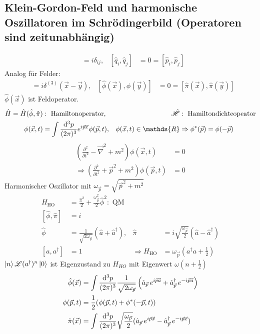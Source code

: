 \subsection{Klein-Gordon-Feld und harmonische Oszillatoren im Schrödingerbild (Operatoren sind zeitunabhängig)}
	\begin{align*}
		[\hat{q}_i, \hat{p}_j] &= i \delta_{ij},&
		[\hat{q}_i, \hat{q}_j] &= 0 = [\hat{p}_i, \hat{p}_j]
	\end{align*}
Analog für Felder:
	\begin{align*}
		[\hat{\phi}(\vec{x}), \hat{\pi}(\vec{y})] &= 
		i \delta^{(3)}(\vec{x}- \vec{y}),&
		[\hat{\phi}(\vec{x}), \hat{\phi}(\vec{y})] &= 0 = 
		[\hat{\pi}(\vec{x}), \hat{\pi}(\vec{y})]
	\end{align*}
$\hat{\phi}(\vec{x})$ ist Feldoperator.
	\begin{align*}
		\hat{H} = \hat{H} (\hat{\phi}, \hat{\pi})&: 
		\text{ Hamiltonoperator},&
		\hat{\Ha}&: \text{ Hamiltondichteopeator} \\
		\phi(\vec{x},t) &= \int \frac{\diff^3 p}{(2 \pi)^3} e^{i\vec{p}\vec{x}} \phi(\vec{p},t),& 
		\phi(\vec{x},t) \in \mathds{R}&\Rightarrow \phi^* (\vec{p}) = \phi (-\vec{p}) 
	\end{align*}
	\begin{align*}
		\left(
			\frac{\partial^2}{\partial t^2} - \vec{\nabla}^2 + m^2
		\right) \phi(\vec{x}, t) &= 0 \\
		\Rightarrow \left(
			\frac{\partial^2}{\partial t^2} + \vec{p}^2 + m^2
		\right) \phi(\vec{p}, t) &= 0
	\end{align*}
Harmonischer Oszillator mit $\omega_{\vec{p}} = \sqrt{\vec{p}^2 + m^2}$
	\begin{align*}
		H_{\text{HO}} &= \frac{\hat{\pi}^2}{2} + \frac{\omega_{\vec{p}}^2}{2} \hat{\phi}^2 : \text{ QM} \\
		[\hat{\phi}, \hat{\pi}] &= i \\
		\hat{\phi} &= \frac{1}{\sqrt{2 \omega_{\vec{p}}}} (\hat{a} + \hat{a}^\dagger),&
		\hat{\pi} &= i \sqrt{\frac{\omega_{\vec{p}}}{2}}( \hat{a} - \hat{a}^\dagger) \\
		[a, a^\dagger] &= 1 & \Rightarrow
		H_{\text{HO}} &= \omega_{\vec{p}}(a^\dagger a + \frac{1}{2})
	\end{align*}
$\ket{n} \mathscr{L} (a^\dagger)^n \ket{0}$ ist Eigenzustand zu $H_{HO}$ mit Eigenwert $\omega (n + \frac{1}{2})$ 
	\begin{align*}
		\hat{\phi} (\vec{x}) &= 
		\int \frac{\mathrm{d}^3 p}{(2 \pi)^3} \frac{1}{\sqrt{2 \omega_{\vec{p}}}}
		\left(	
			\hat{a}_{\vec{p}} \,e^{i\vec{p}\vec{a}} + \hat{a}^\dagger_{\vec{p}}\, e^{-i\vec{p}\vec{a}}
		\right) \\
		\phi (\vec{p},t) &= \frac{1}{2} (\phi(\vec{p},t) + \phi^*(-\vec{p},t)) \\
		\hat{\pi}(\vec{x}) &= \int \frac{\mathrm{d}^3 p}{(2\pi)^3}
		\sqrt{\frac{\omega_{\vec{p}}}{2}} (\hat{a}_{\vec{p}} \,e^{i \vec{p} \vec{x}} -
		\hat{a}^\dagger_{\vec{p}} \,e^{- i \vec{p} \vec{x}}) 
	\end{align*}
